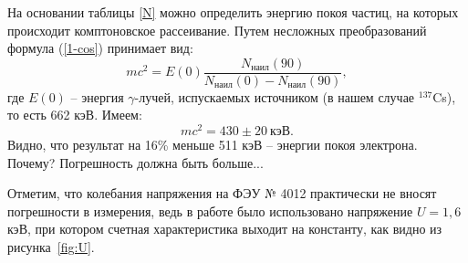 \documentclass[a5paper, 10pt, twoside]{article} %
\begin{document}
На основании таблицы \ref{N} можно определить энергию покоя частиц, на которых
происходит комптоновское рассеивание. Путем несложных преобразований формула
(\ref{1-cos}) принимает вид:
\begin{equation*}
  mc^2 = E(0) \frac{N_\text{наил}(90)}{N_\text{наил}(0)-N_\text{наил}(90)},
\end{equation*}
где $E(0)$ -- энергия $\gamma$-лучей, испускаемых источником (в нашем случае
$^{137}$Cs), то есть 662 кэВ. Имеем:
\[
  \boxed{mc^2 = 430 \pm 20 \ \text{кэВ}}.
\]
Видно, что результат на 16\% меньше 511 кэВ -- энергии покоя электрона.
Почему? Погрешность должна быть больше...

Отметим, что колебания напряжения на ФЭУ № 4012 практически не вносят
погрешности в измерения, ведь в работе было использовано напряжение $U = 1,6$
кэВ, при котором счетная характеристика выходит на константу, как видно из
рисунка~\ref{fig:U}.
\end{document}
